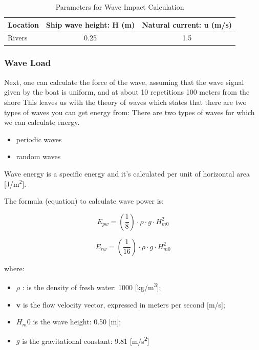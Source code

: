 \begin{table}[H]
    \centering
    \caption{Parameters for Wave Impact Calculation}
    \label{tab:Parameters for Wave Impact Calculation}
    \begin{tabular}{lcc}
        \toprule
        \textbf{Location} & \textbf{Ship wave height: H (m)} & \textbf{Natural current: u (m/s)} \\
        \midrule
        Rivers & 0.25 & 1.5 \\
        \bottomrule
    \end{tabular}
\end{table}

\subsubsection{Wave Load}
Next, one can calculate the force of the wave, assuming that the wave signal given by the boat is uniform, and at about 10 repetitions 100 meters from the shore
This leaves us with the theory of waves \autocite{} which states that there are two types of waves you can get energy from:
There are two types of waves for which we can calculate energy.

\begin{itemize}
    \item periodic waves 
    \item random waves 
\end{itemize}

Wave energy is a specific energy and it's calculated per unit of horizontal area [J/m$^2$].

The formula (equation) to calculate wave power is:

$$
{E_{pw} = \left(\frac{1}{8}\right) \cdot \rho \cdot g \cdot H_{m0}^2}
$$

$$
{E_{rw} = \left(\frac{1}{16}\right) \cdot \rho \cdot g \cdot H_{m0}^2}
$$

\noindent where:
\begin{itemize}
    \item $\rho$ : is the density of fresh water: 1000 [kg/m\textsuperscript{3}];
    \item \(\mathbf{v}\) is the flow velocity vector, expressed in meters per second [m/s];
    \item \(H_m0\) is the wave height: 0.50 [m];
    \item \(g\) is the gravitational constant: 9.81 [m/s\textsuperscript{2}]
\end{itemize}

